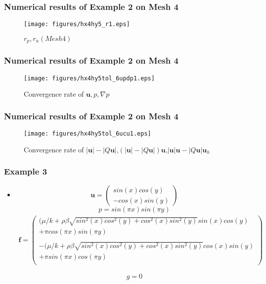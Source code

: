 \documentclass[notheorems,serif]{beamer}
\begin{document}
\begin{frame}
\frametitle{Numerical results of Example 2 on Mesh 4}
\begin{figure}[H] 
\centering 
\texttt{[image: figures/hx4hy5\_r1.eps]} 
\caption{$r_p, r_u(Mesh 4)$}
\label{fig:rpmesh4p2}
\end{figure}
\end{frame}

\begin{frame}
\frametitle{Numerical results of Example 2 on Mesh 4}
\begin{figure}[H] 
\centering 
\texttt{[image: figures/hx4hy5tol\_6updp1.eps]} 
\caption{Convergence rate of $\boldsymbol{u}, p, \nabla p$}
\label{fig:upmesh4p2} 
\end{figure}
\end{frame}

\begin{frame}
\frametitle{Numerical results of Example 2 on Mesh 4}
\begin{figure}[H] 
\centering 
\texttt{[image: figures/hx4hy5tol\_6ucu1.eps]} 
\caption{Convergence rate of $\left|\boldsymbol{u}\right|-\left|Q\boldsymbol{u}\right|$,$(\left|\boldsymbol{u}\right|-\left|Q\boldsymbol{u}\right|)\boldsymbol{u}$,$\left|\boldsymbol{u}\right|\boldsymbol{u}-\left|Q\boldsymbol{u}\right|\boldsymbol{u}_h$}
\label{fig:normumesh4p2} 
\end{figure}
\end{frame}

\begin{frame}
\frametitle{Example 3}
\begin{itemize}
\item \begin{equation*}
\boldsymbol{u} = \begin{pmatrix}
sin(x)cos(y) \\
-cos(x)sin(y)
\end{pmatrix}
\end{equation*}
\begin{equation*}
p = sin(\pi x)sin(\pi y)
\end{equation*}
\begin{equation*}
\begin{split}
\boldsymbol{f} = \begin{pmatrix}
(\mu/k + \rho\beta\sqrt{sin^2(x)cos^2(y) + cos^2(x)sin^2(y)}sin(x)cos(y) \\
 + \pi cos(\pi x)sin(\pi y) \\
 \\
-(\mu/k + \rho\beta\sqrt{sin^2(x)cos^2(y) + cos^2(x)sin^2(y)}cos(x)sin(y) \\
 + \pi sin(\pi x)cos(\pi y) \\
\end{pmatrix}
\end{split}
\end{equation*}

\begin{equation*}
g = 0
\end{equation*}

\end{itemize}

\end{frame}
\end{document}
